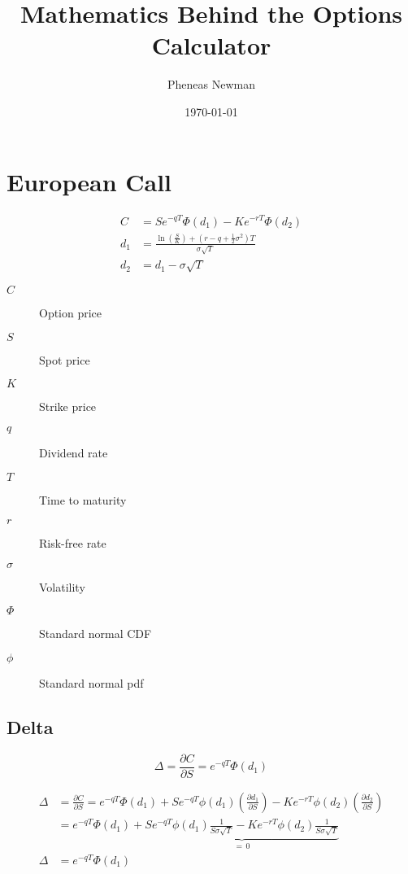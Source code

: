 \documentclass[12pt,a4paper]{article}
\begin{document}
\title{Mathematics Behind the Options Calculator}
\author{Pheneas Newman}
\date{\today}
\maketitle

\section{European Call}

\[
  \begin{aligned}
    C   & = S e^{-qT} \Phi(d_1) - K e^{-rT} \Phi(d_2)                             \\ d_1 & = \frac{\ln\!
    \left(\tfrac{S}{K}\right) + (r - q + \tfrac{1}{2}\sigma^2)T}{\sigma \sqrt{T}} \\
    d_2 & = d_1 - \sigma \sqrt{T}
  \end{aligned}
\]

\begin{description}
  \item[$C$] Option price
  \item[$S$] Spot price
  \item[$K$] Strike price
  \item[$q$] Dividend rate
  \item[$T$] Time to maturity
  \item[$r$] Risk-free rate
  \item[$\sigma$] Volatility
  \item[$\Phi$] Standard normal CDF
  \item[$\phi$] Standard normal pdf
\end{description}

\subsection{Delta}
\[
  \boxed{\Delta = \frac{\partial C}{\partial S} = e^{-qT}\Phi(d_1)}
\]

\[
  \begin{aligned}
    \Delta & = \frac{\partial C}{\partial S} = e^{-qT}\Phi(d_1) + Se^{-q T}\phi(d_1)\left(\frac{\partial d_1}{\partial S}\right) - Ke^{-rT}\phi(d_2)\left(\frac{\partial d_2}{\partial S} \right) \\
           & = e^{-qT}\Phi(d_1) + \underbrace{Se^{-qT}\phi(d_1)\frac{1}{S \sigma \sqrt{T}} - Ke^{-rT}\phi(d_2)\frac{1}{S \sigma \sqrt{T}}}_{=\,0}                                                 \\
    \Delta & = e^{-qT}\Phi(d_1)
  \end{aligned}
\]
\end{document}
